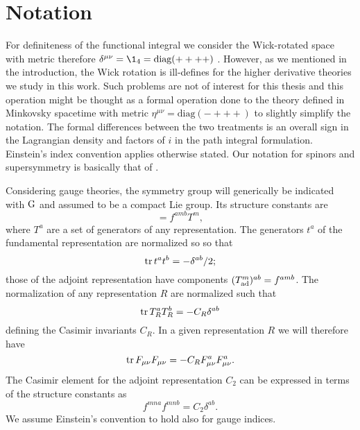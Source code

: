 

	\fancyfoot[CE,CO]{\thepage}
	\fancyfoot[LO,RO]{ }
	\fancyfoot[LE,RE]{ }
\chapter{Notation}



For definiteness of the functional integral we consider the Wick-rotated space with metric therefore
\(
\delta^{\mu\nu}
= \1_4
=
\text{diag}(++++)
\)
.
However, as we mentioned in the introduction, the Wick rotation is ill-defines for the higher derivative theories we study in this work. Such problems are not of interest for this thesis and this operation might be thought as a formal operation done to the theory defined in Minkovsky spacetime with metric \(\eta^{\mu\nu}=\text{diag}(-+++)\) to slightly simplify the notation. The formal differences between the two treatments is an overall sign in the Lagrangian density and factors of $i$ in the path integral formulation.
Einstein's index convention applies otherwise stated.
Our notation for spinors and supersymmetry is basically that of \cite{WB}.

Considering gauge theories, the symmetry group will generically be indicated with ${ \text{G} }$ and assumed to be a compact Lie group. Its structure constants are
\begin{equation}
	[T^a,T^b] = f^{amb} T^m,
\end{equation}
where $T^a$ are a set of generators of any representation. 
The generators \(t^a\) of the fundamental representation are normalized so so that \begin{equation}\label{notation-tr-generatord-fundam}
\operatorname{tr} t^a t^b = - \delta^{ab}/2 ;
\end{equation}  those of the adjoint representation have components
\(
(T_{ \text{ad} }^m)^{ab} = f^{amb}
\).
The normalization of any representation $R$ are normalized such that
\begin{equation}
\operatorname{tr} T_R^a  T_R^b = - C_R \delta^{ab} 
\end{equation}
defining the Casimir invariants $C_R$.
In a given representation $R$ we will therefore have
\begin{equation}\label{notation-trFmunuFmunu}
\operatorname{tr} F_{\mu\nu} F_{\mu\nu}
	=
- C_R F_{\mu\nu}^a F_{\mu\nu}^a.
\end{equation}
The Casimir element for the adjoint representation $C_2$ can be expressed in terms of the structure constants as
\begin{equation}
f^{mna} f^{mnb} =  C_2 \delta^{ab}.
\end{equation}
We assume Einstein's convention to hold also for gauge indices.


